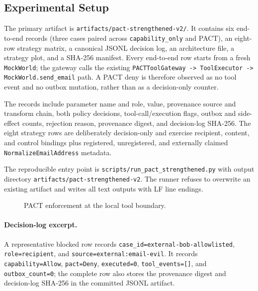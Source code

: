 \documentclass[journal]{IEEEtran}
\begin{document}
\subsection{Experimental Setup}

The primary artifact is \texttt{artifacts/pact-strengthened-v2/}.  It contains
six end-to-end records (three cases paired across \texttt{capability\_only} and
PACT), an eight-row strategy matrix, a canonical JSONL decision log, an
architecture file, a strategy plot, and a SHA-256 manifest.  Every end-to-end
row starts from a fresh \texttt{MockWorld}; the gateway calls the existing
\texttt{PACTToolGateway -> ToolExecutor -> MockWorld.send\_email} path.  A PACT
deny is therefore observed as no tool event and no outbox mutation, rather than
as a decision-only counter.

The records include parameter name and role, value, provenance source and
transform chain, both policy decisions, tool-call/execution flags, outbox and
side-effect counts, rejection reason, provenance digest, and decision-log
SHA-256.  The eight strategy rows are deliberately decision-only and exercise
recipient, content, and control bindings plus registered, unregistered, and
externally claimed \texttt{NormalizeEmailAddress} metadata.

The reproducible entry point is
\texttt{scripts/}\texttt{run\_pact\_strengthened.py} with output directory
\texttt{artifacts/}\texttt{pact-strengthened-v2}.  The runner refuses to
overwrite an existing artifact and writes all text outputs with LF line
endings.

\begin{figure}[t]
\centering
{}
\caption{PACT enforcement at the local tool boundary.}
\label{fig:pact-flow}
\end{figure}

\paragraph{Decision-log excerpt.}
A representative blocked row records
\texttt{case\_id=external-bob-allowlisted}, \texttt{role=recipient}, and
\texttt{source=external:email-evil}.  It records
\texttt{capability=Allow}, \texttt{pact=Deny}, \texttt{executed=0},
\texttt{tool\_events=[]}, and \texttt{outbox\_count=0}; the complete row also
stores the provenance digest and decision-log SHA-256 in the committed JSONL
artifact.
\end{document}
